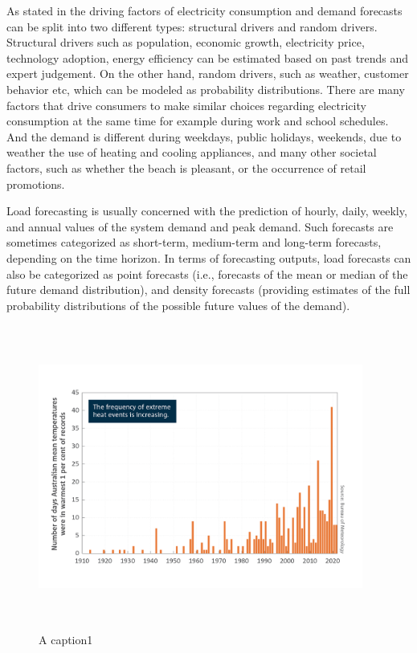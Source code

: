 \documentclass[mstat,12pt]{unswthesis}
\begin{document}
As stated in \cite{nswEnergyConsumption} the driving factors of
electricity consumption and demand forecasts can be split into two
different types: structural drivers and random drivers. Structural
drivers such as population, economic growth, electricity price,
technology adoption, energy efficiency can be estimated based on past
trends and expert judgement. On the other hand, random drivers, such as
weather, customer behavior etc, which can be modeled as probability
distributions. There are many factors that drive consumers to make
similar choices regarding electricity consumption at the same time for
example during work and school schedules. And the demand is different
during weekdays, public holidays, weekends, due to weather the use of
heating and cooling appliances, and many other societal factors, such as
whether the beach is pleasant, or the occurrence of retail promotions.

Load forecasting is usually concerned with the prediction of hourly,
daily, weekly, and annual values of the system demand and peak demand.
Such forecasts are sometimes categorized as short-term, medium-term and
long-term forecasts, depending on the time horizon. In terms of
forecasting outputs, load forecasts can also be categorized as point
forecasts (i.e., forecasts of the mean or median of the future demand
distribution), and density forecasts (providing estimates of the full
probability distributions of the possible future values of the demand).

\begin{figure}[H]
\centering
\includegraphics[width=0.95\textwidth, height=10cm]{extreme_temp__au.png}
\caption{A caption1}\label{extreme}
\end{figure}
\end{document}
